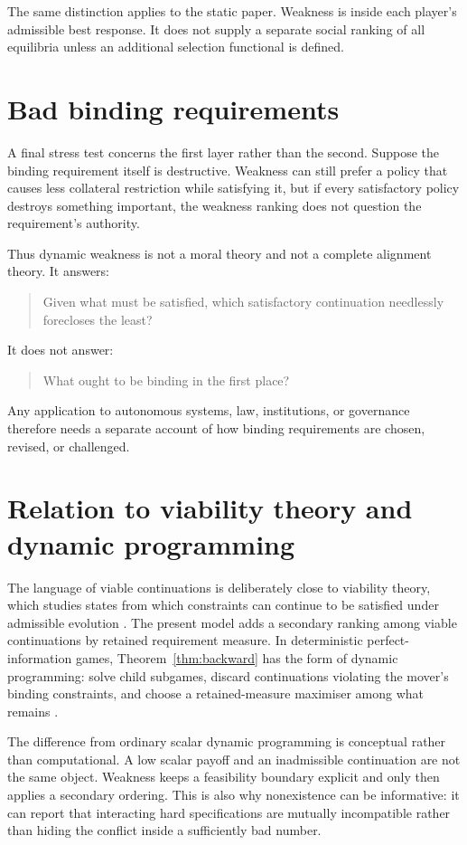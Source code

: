 \documentclass[11pt]{article}
\theoremstyle{definition}
\begin{document}
The same distinction applies to the static paper. Weakness is inside each player's admissible best response. It does not supply a separate social ranking of all equilibria unless an additional selection functional is defined.

\section{Bad binding requirements}

A final stress test concerns the first layer rather than the second. Suppose the binding requirement itself is destructive. Weakness can still prefer a policy that causes less collateral restriction while satisfying it, but if every satisfactory policy destroys something important, the weakness ranking does not question the requirement's authority.

Thus dynamic weakness is not a moral theory and not a complete alignment theory. It answers:
\begin{quote}
Given what must be satisfied, which satisfactory continuation needlessly forecloses the least?
\end{quote}
It does not answer:
\begin{quote}
What ought to be binding in the first place?
\end{quote}
Any application to autonomous systems, law, institutions, or governance therefore needs a separate account of how binding requirements are chosen, revised, or challenged.

\section{Relation to viability theory and dynamic programming}

The language of viable continuations is deliberately close to viability theory, which studies states from which constraints can continue to be satisfied under admissible evolution \cite{aubin}. The present model adds a secondary ranking among viable continuations by retained requirement measure. In deterministic perfect-information games, Theorem~\ref{thm:backward} has the form of dynamic programming: solve child subgames, discard continuations violating the mover's binding constraints, and choose a retained-measure maximiser among what remains \cite{bellman,osbornerubinstein}.

The difference from ordinary scalar dynamic programming is conceptual rather than computational. A low scalar payoff and an inadmissible continuation are not the same object. Weakness keeps a feasibility boundary explicit and only then applies a secondary ordering. This is also why nonexistence can be informative: it can report that interacting hard specifications are mutually incompatible rather than hiding the conflict inside a sufficiently bad number.
\end{document}
